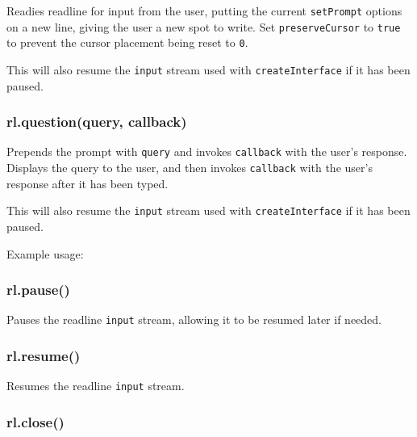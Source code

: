 Readies readline for input from the user, putting the current
\texttt{setPrompt} options on a new line, giving the user a new spot to
write. Set \texttt{preserveCursor} to \texttt{true} to prevent the
cursor placement being reset to \texttt{0}.

This will also resume the \texttt{input} stream used with
\texttt{createInterface} if it has been paused.

\subsubsection{rl.question(query, callback)}

Prepends the prompt with \texttt{query} and invokes \texttt{callback}
with the user's response. Displays the query to the user, and then
invokes \texttt{callback} with the user's response after it has been
typed.

This will also resume the \texttt{input} stream used with
\texttt{createInterface} if it has been paused.

Example usage:

\begin{Shaded}
\begin{Highlighting}[]
\NormalTok{(}\NormalTok{, }
  \NormalTok{(} 
\NormalTok{\});}
\end{Highlighting}
\end{Shaded}

\subsubsection{rl.pause()}

Pauses the readline \texttt{input} stream, allowing it to be resumed
later if needed.

\subsubsection{rl.resume()}

Resumes the readline \texttt{input} stream.

\subsubsection{rl.close()}

